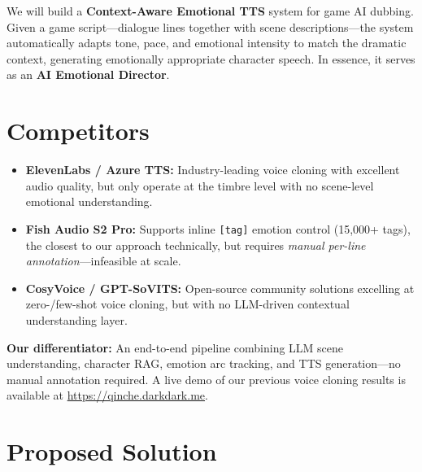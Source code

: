 \documentclass[11pt,a4paper]{article}
\begin{document}
We will build a \textbf{Context-Aware Emotional TTS} system for game AI dubbing. Given a game script---dialogue lines together with scene descriptions---the system automatically adapts tone, pace, and emotional intensity to match the dramatic context, generating emotionally appropriate character speech. In essence, it serves as an \textbf{AI Emotional Director}.

\section{Competitors}

\begin{itemize}
    \item \textbf{ElevenLabs / Azure TTS:} Industry-leading voice cloning with excellent audio quality, but only operate at the timbre level with no scene-level emotional understanding.
    \item \textbf{Fish Audio S2 Pro:} Supports inline \texttt{[tag]} emotion control (15,000+ tags), the closest to our approach technically, but requires \emph{manual per-line annotation}---infeasible at scale.
    \item \textbf{CosyVoice / GPT-SoVITS:} Open-source community solutions excelling at zero-/few-shot voice cloning, but with no LLM-driven contextual understanding layer.
\end{itemize}

\textbf{Our differentiator:} An end-to-end pipeline combining LLM scene understanding, character RAG, emotion arc tracking, and TTS generation---no manual annotation required. A live demo of our previous voice cloning results is available at \url{https://qinche.darkdark.me}.

\section{Proposed Solution}
\end{document}
